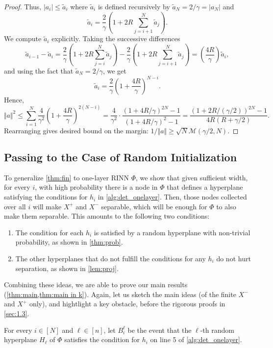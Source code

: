 \documentclass[aoap]{imsart}
\numberwithin{equation}{section}
\theoremstyle{definition}
\theoremstyle{remark}
\numberwithin{equation}{section}
\newcommand{\0}{\mathbf{0}}
\newcommand{\1}{\mathbf{1}}
\numberwithin{equation}{section}
\begin{document}
\begin{proof}
Thus, $\vert a_{i}\vert \leq \tilde{a}_{i}$ where $\tilde{a}_{i}$ is defined recursively by $\tilde{a}_{N}= 2/\gamma = \vert a_{N}\vert$ and 
\[
    \tilde{a}_{i} = \frac{2}{\gamma}\left(1 + 2R \sum_{j=i+1}^N \tilde{a}_j\right).
\]
We compute $\tilde{a}_{i}$ explicitly. Taking the successive differences
\[
    \tilde{a}_{i-1}-\tilde{a}_{i} = \frac{2}{\gamma}\left(1 + 2R \sum_{j=i}^N \tilde{a}_j\right) - \frac{2}{\gamma}\left(1 + 2R \sum_{j=i+1}^N \tilde{a}_j\right) = \left(\frac{4R}{\gamma}\right)\tilde{a}_{i},
\]
and using the fact that $\tilde{a}_{N}= 2/\gamma$, we get
\[
    \tilde{a}_{i} = \frac{2}{\gamma}\left(1+\frac{4R}{\gamma}\right)^{N-i}.
\]
Hence,
\[
\Vert a\Vert ^{2} \leq \sum_{i=1}^{N}\frac{4}{\gamma^{2}}\left(1+\frac{4R}{\gamma}\right)^{2(N-i)} = \frac{4}{\gamma^{2}} \cdot \frac{(1+4R/\gamma)^{2N}-1}{(1+4R/\gamma )^{2}-1} = \frac{(1+2R/(\gamma/2))^{2N}-1}{4R(R+\gamma/2)}.
\]
Rearranging gives desired bound on the margin: $1/\Vert a\Vert\ge \sqrt{N}\mathcal{M}(\gamma/2, N)$.
\end{proof}
\subsection{Passing to the Case of Random Initialization}
To generalize \cref{thm:fin} to one-layer RINN $\Phi$, we show that given sufficient width, for every $i$, with high probability there is a node in $\Phi$ that defines a hyperplane satisfying the conditions for $h_{i}$ in \cref{alg:det_onelayer}. Then, those nodes collected over all $i$ will make $X^{+}$ and $X^{-}$ separable, which will be enough for $\Phi$ to also make them separable. This amounts to the following two conditions:
\begin{enumerate}
\item The condition for each $h_{i}$ is satisfied by a random hyperplane with non-trivial probability, as shown in \cref{thm:prob}.
\item The other hyperplanes that do not fulfill the conditions for any $h_{i}$ do not hurt separation, as shown in \cref{lem:proj}.
\end{enumerate}

Combining these ideas, we are able to prove our main results (\cref{thm:main,thm:main in k}). Again, let us sketch the main ideas (of the finite $X^-$ and $X^+$ only), and hightlight a key obstacle, before the rigorous proofs in \cref{sec:1.3}.

For every $i\in [N]$ and $\ell\in [n]$, let $B_i^\ell$ be the event that the $\ell$-th random hyperplane $H_\ell$ of $\Phi$ satisfies the condition for $h_i$ on line 5 of \cref{alg:det_onelayer}.
\end{document}
